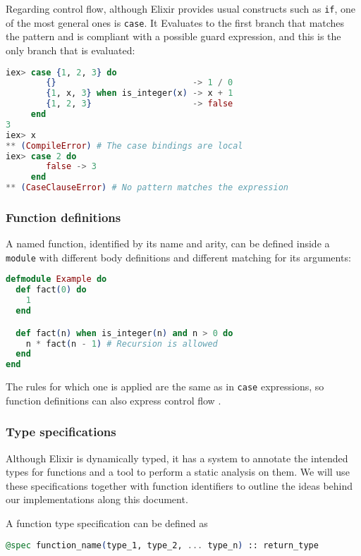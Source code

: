 Regarding control flow, although Elixir provides usual constructs such as 
\verb|if|, one of the most general ones is \verb|case|. It Evaluates to 
the first branch that matches the pattern and is compliant with a possible
guard expression, and this is the only branch that is evaluated:

\begin{lstlisting}[language=elixir,numbers=none,frame=none]
iex> case {1, 2, 3} do 
        {}                           -> 1 / 0
        {1, x, 3} when is_integer(x) -> x + 1
        {1, 2, 3}                    -> false
     end
3
iex> x
** (CompileError) # The case bindings are local
iex> case 2 do 
        false -> 3 
     end 
** (CaseClauseError) # No pattern matches the expression
\end{lstlisting}

\subsubsection{Function definitions}

A named function, identified by its name and arity, can be defined inside 
a \verb|module| with different body definitions and different matching for
its arguments:

\begin{lstlisting}[language=elixir,numbers=none,frame=none]
defmodule Example do 
  def fact(0) do 
    1
  end

  def fact(n) when is_integer(n) and n > 0 do 
    n * fact(n - 1) # Recursion is allowed
  end
end
\end{lstlisting}

The rules for which one is applied are the same as in \verb|case| expressions,
so function definitions can also express control flow \citep{programmingElixir}.

\subsubsection{Type specifications}
\label{prelim:typespecs}

Although Elixir is dynamically typed, it has a system to annotate the intended
types for functions and a tool to perform a static analysis on them. We will
use these specifications together with function identifiers to outline the ideas
behind our implementations along this document.

A function type specification can be defined as 

\begin{lstlisting}[language=elixir,numbers=none,frame=none]
@spec function_name(type_1, type_2, ... type_n) :: return_type
\end{lstlisting}

